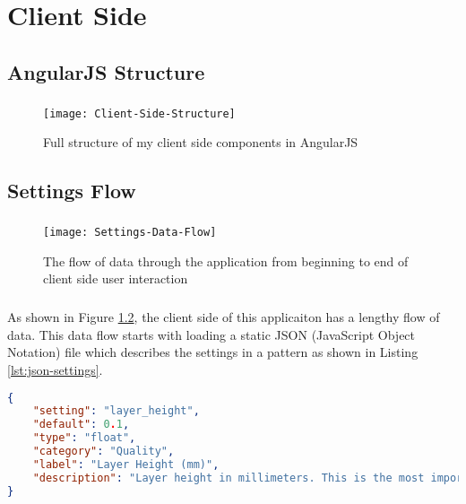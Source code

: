 \chapter{Client Side}

\section{AngularJS Structure}
\paragraph{}

\begin{figure}[!ht]
  \centering
  \texttt{[image: Client-Side-Structure]}
  \caption{Full structure of my client side components in AngularJS}
  \label{fig:client-side-structure}
\end{figure}

\section{Settings Flow}
\paragraph{}

\begin{figure}[!ht]
  \centering
  \texttt{[image: Settings-Data-Flow]}
  \caption{The flow of data through the application from beginning to end of client side user interaction}
  \label{fig:settings-data-flow}
\end{figure}

\paragraph{}
As shown in Figure \ref{fig:settings-data-flow}, the client side of this applicaiton has a lengthy flow of data.
This data flow starts with loading a static JSON (JavaScript Object Notation) file which describes the settings in a pattern as shown in Listing \ref{lst:json-settings}.

\begin{lstlisting}[language=json, label={lst:json-settings}, caption=A sample from a static settings file in JSON format.]
{
    "setting": "layer_height",
    "default": 0.1,
    "type": "float",
    "category": "Quality",
    "label": "Layer Height (mm)",
    "description": "Layer height in millimeters. This is the most important setting to determine the quality of your print. Normal quality prints are 0.1mm, high quality is 0.06mm. You can go up to 0.25mm."
}
\end{lstlisting}

